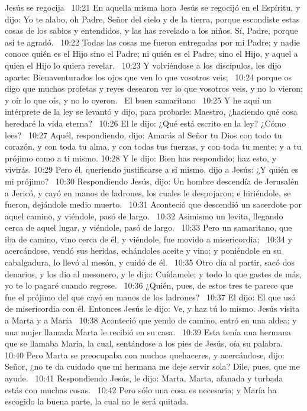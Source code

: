 Jesús se regocija   
10:21 En aquella misma hora Jesús se regocijó en el Espíritu, y dijo: Yo te alabo, oh Padre, Señor del cielo y de la tierra, porque escondiste estas cosas de los sabios y entendidos, y las has revelado a los niños. Sí, Padre, porque así te agradó.  
10:22 Todas las cosas me fueron entregadas por mi Padre; y nadie conoce quién es el Hijo sino el Padre; ni quién es el Padre, sino el Hijo, y aquel a quien el Hijo lo quiera revelar.  
10:23 Y volviéndose a los discípulos, les dijo aparte: Bienaventurados los ojos que ven lo que vosotros veis;  
10:24 porque os digo que muchos profetas y reyes desearon ver lo que vosotros veis, y no lo vieron; y oír lo que oís, y no lo oyeron.  
El buen samaritano  
10:25 Y he aquí un intérprete de la ley se levantó y dijo, para probarle: Maestro, ¿haciendo qué cosa heredaré la vida eterna?  
10:26 El le dijo: ¿Qué está escrito en la ley? ¿Cómo lees?  
10:27 Aquél, respondiendo, dijo: Amarás al Señor tu Dios con todo tu corazón, y con toda tu alma, y con todas tus fuerzas, y con toda tu mente; y a tu prójimo como a ti mismo. 
10:28 Y le dijo: Bien has respondido; haz esto, y vivirás. 
10:29 Pero él, queriendo justificarse a sí mismo, dijo a Jesús: ¿Y quién es mi prójimo?  
10:30 Respondiendo Jesús, dijo: Un hombre descendía de Jerusalén a Jericó, y cayó en manos de ladrones, los cuales le despojaron; e hiriéndole, se fueron, dejándole medio muerto.  
10:31 Aconteció que descendió un sacerdote por aquel camino, y viéndole, pasó de largo.  
10:32 Asimismo un levita, llegando cerca de aquel lugar, y viéndole, pasó de largo.  
10:33 Pero un samaritano, que iba de camino, vino cerca de él, y viéndole, fue movido a misericordia;  
10:34 y acercándose, vendó sus heridas, echándoles aceite y vino; y poniéndole en su cabalgadura, lo llevó al mesón, y cuidó de él.  
10:35 Otro día al partir, sacó dos denarios, y los dio al mesonero, y le dijo: Cuídamele; y todo lo que gastes de más, yo te lo pagaré cuando regrese.  
10:36 ¿Quién, pues, de estos tres te parece que fue el prójimo del que cayó en manos de los ladrones?  
10:37 El dijo: El que usó de misericordia con él. Entonces Jesús le dijo: Ve, y haz tú lo mismo. 
Jesús visita a Marta y a María  
10:38 Aconteció que yendo de camino, entró en una aldea; y una mujer llamada Marta le recibió en su casa.  
10:39 Esta tenía una hermana que se llamaba María, la cual, sentándose a los pies de Jesús, oía su palabra.  
10:40 Pero Marta se preocupaba con muchos quehaceres, y acercándose, dijo: Señor, ¿no te da cuidado que mi hermana me deje servir sola? Dile, pues, que me ayude.  
10:41 Respondiendo Jesús, le dijo: Marta, Marta, afanada y turbada estás con muchas cosas.  
10:42 Pero sólo una cosa es necesaria; y María ha escogido la buena parte, la cual no le será quitada.  
